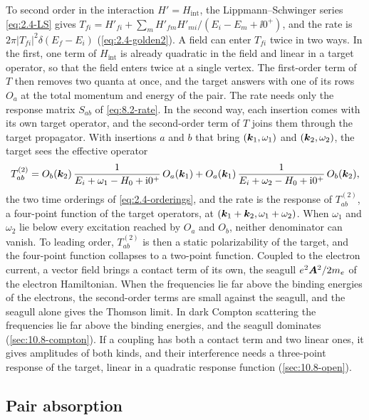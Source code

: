 To second order in the interaction $H' = H_{\mathrm{int}}$, the Lippmann--Schwinger series \cref{eq:2.4-LS} gives $T_{fi} = H'_{fi} + \sum_mH'_{fm}H'_{mi}/(E_i - E_m + \ii0^+)$, and the rate is $2\pi|T_{fi}|^2\delta(E_f - E_i)$ (\cref{eq:2.4-golden2}). A field can enter $T_{fi}$ twice in two ways. In the first, one term of $H_{\mathrm{int}}$ is already quadratic in the field and linear in a target operator, so that the field enters twice at a single vertex. The first-order term of $T$ then removes two quanta at once, and the target answers with one of its rows $O_a$ at the total momentum and energy of the pair. The rate needs only the response matrix $S_{ab}$ of \cref{eq:8.2-rate}. In the second way, each insertion comes with its own target operator, and the second-order term of $T$ joins them through the target propagator. With insertions $a$ and $b$ that bring $(\bm{k}_1, \omega_1)$ and $(\bm{k}_2, \omega_2)$, the target sees the effective operator
\begin{equation}
  T^{(2)}_{ab} = O_b(\bm{k}_2)\,\frac{1}{E_i + \omega_1 - H_0 + \mathrm{i}0^+}\,O_a(\bm{k}_1) + O_a(\bm{k}_1)\,\frac{1}{E_i + \omega_2 - H_0 + \mathrm{i}0^+}\,O_b(\bm{k}_2) ,
  \label{eq:10.8-T2}
\end{equation}
the two time orderings of \cref{eq:2.4-orderings}, and the rate is the response of $T^{(2)}_{ab}$, a four-point function of the target operators, at $(\bm{k}_1 + \bm{k}_2, \omega_1 + \omega_2)$. When $\omega_1$ and $\omega_2$ lie below every excitation reached by $O_a$ and $O_b$, neither denominator can vanish. To leading order, $T^{(2)}_{ab}$ is then a static polarizability of the target, and the four-point function collapses to a two-point function. Coupled to the electron current, a vector field brings a contact term of its own, the seagull $e^2\bm{A}^2/2m_e$ of the electron Hamiltonian. When the frequencies lie far above the binding energies of the electrons, the second-order terms are small against the seagull, and the seagull alone gives the Thomson limit. In dark Compton scattering the frequencies lie far above the binding energies, and the seagull dominates (\cref{sec:10.8-compton}). If a coupling has both a contact term and two linear ones, it gives amplitudes of both kinds, and their interference needs a three-point response of the target, linear in a quadratic response function (\cref{sec:10.8-open}).

\subsection{Pair absorption}\label{sec:10.8-pair}

